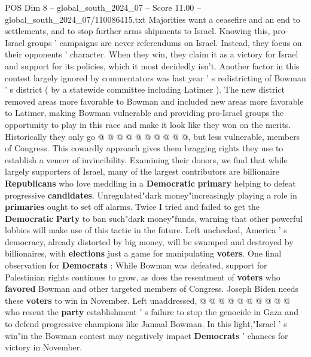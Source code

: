 \begin{textsample}{POS Dim 8 – global\_south\_2024\_07 – Score 11.00 – global\_south\_2024\_07/110086415.txt}
Majorities want a ceasefire and an end to settlements, and to stop further arms shipments to Israel.
Knowing this, pro-Israel groups ' campaigns are never referendums on Israel.
Instead, they focus on their opponents ' character.
When they win, they claim it as a victory for Israel and support for its policies, which it most decidedly isn't.
Another factor in this contest largely ignored by commentators was last year ' s redistricting of Bowman ' s district ( by a statewide committee including Latimer ).
The new district removed areas more favorable to Bowman and included new areas more favorable to Latimer, making Bowman vulnerable and providing pro-Israel groups the opportunity to play in this race and make it look like they won on the merits.
Historically they only go @ @ @ @ @ @ @ @ @ @, but less vulnerable, members of Congress.
This cowardly approach gives them bragging rights they use to establish a veneer of invincibility.
Examining their donors, we find that while largely supporters of Israel, many of the largest contributors are billionaire \textbf{Republicans} who love meddling in a \textbf{Democratic} \textbf{primary} helping to defeat progressive \textbf{candidates}.
Unregulated"dark money"increasingly playing a role in \textbf{primaries} ought to set off alarms.
Twice I tried and failed to get the \textbf{Democratic} \textbf{Party} to ban such"dark money"funds, warning that other powerful lobbies will make use of this tactic in the future.
Left unchecked, America ' s democracy, already distorted by big money, will be swamped and destroyed by billionaires, with \textbf{elections} just a game for manipulating \textbf{voters}.
One final observation for \textbf{Democrats} : While Bowman was defeated, support for Palestinian rights continues to grow, as does the resentment of \textbf{voters} who \textbf{favored} Bowman and other targeted members of Congress.
Joseph Biden needs these \textbf{voters} to win in November.
Left unaddressed, @ @ @ @ @ @ @ @ @ @ who resent the \textbf{party} establishment ' s failure to stop the genocide in Gaza and to defend progressive champions like Jamaal Bowman.
In this light,"Israel ' s win"in the Bowman contest may negatively impact \textbf{Democrats} ' chances for victory in November.

\end{textsample}
